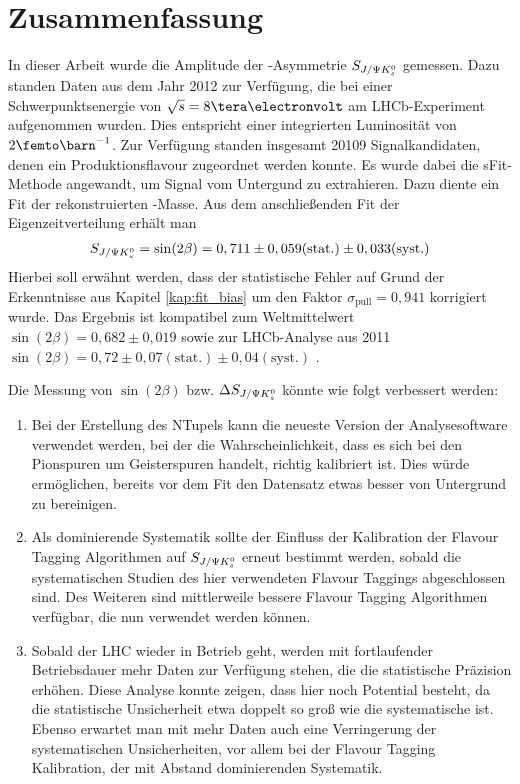 \chapter{Zusammenfassung}
In dieser Arbeit wurde die Amplitude der \CP-Asymmetrie $S_{J/\Psi K_s^0}$ gemessen. Dazu standen Daten aus dem Jahr 2012 zur Verfügung, die bei einer Schwerpunktsenergie von $\sqrt{s}=8\tera\electronvolt$ am LHCb-Experiment aufgenommen wurden. Dies entspricht einer integrierten Luminosität von $2\femto\barn^{-1}$. Zur Verfügung standen insgesamt 20109 Signalkandidaten, denen ein Produktionsflavour zugeordnet werden konnte. Es wurde dabei die sFit-Methode angewandt, um Signal vom Untergund zu extrahieren. Dazu diente ein Fit der rekonstruierten \Bd-Masse. Aus dem anschließenden Fit der Eigenzeitverteilung erhält man
\begin{align}
S_{J/\Psi K_s^0} = \sin(2\beta) = 0,711 \pm 0,059 (\text{stat.}) \pm 0,033 (\text{syst.})
\end{align}
Hierbei soll erwähnt werden, dass der statistische Fehler auf Grund der Erkenntnisse aus Kapitel \ref{kap:fit_bias} um den Faktor $\sigma_{\text{pull}} = 0,941$ korrigiert wurde. Das Ergebnis ist kompatibel zum Weltmittelwert $\sin(2\beta) = 0,682 \pm 0,019$ \cite{pdg-average} sowie zur LHCb-Analyse aus 2011 $\sin(2\beta) = 0,72 \pm 0,07 (\text{stat.}) \pm 0,04 (\text{syst.})$ \cite{lhcb-paper}. 

Die Messung von $\sin(2\beta)$ bzw. $\Delta S_{J/\Psi K_s^0}$ könnte wie folgt verbessert werden:
\begin{enumerate}
    \item Bei der Erstellung des NTupels kann die neueste Version der Analysesoftware verwendet werden, bei der die Wahrscheinlichkeit, dass es sich bei den Pionspuren um Geisterspuren handelt, richtig kalibriert ist. Dies würde ermöglichen, bereits vor dem Fit den Datensatz etwas besser von Untergrund zu bereinigen.
    \item Als dominierende Systematik sollte der Einfluss der Kalibration der Flavour Tagging Algorithmen auf $S_{J/\Psi K_s^0}$ erneut bestimmt werden, sobald die systematischen Studien des hier verwendeten Flavour Taggings abgeschlossen sind. Des Weiteren sind mittlerweile bessere Flavour Tagging Algorithmen verfügbar, die nun verwendet werden können.
    \item Sobald der LHC wieder in Betrieb geht, werden mit fortlaufender Betriebsdauer mehr Daten zur Verfügung stehen, die die statistische Präzision erhöhen. Diese Analyse konnte zeigen, dass hier noch Potential besteht, da die statistische Unsicherheit etwa doppelt so groß wie die systematische ist. Ebenso erwartet man mit mehr Daten auch eine Verringerung der systematischen Unsicherheiten, vor allem bei der Flavour Tagging Kalibration, der mit Abstand dominierenden Systematik.
\end{enumerate}
